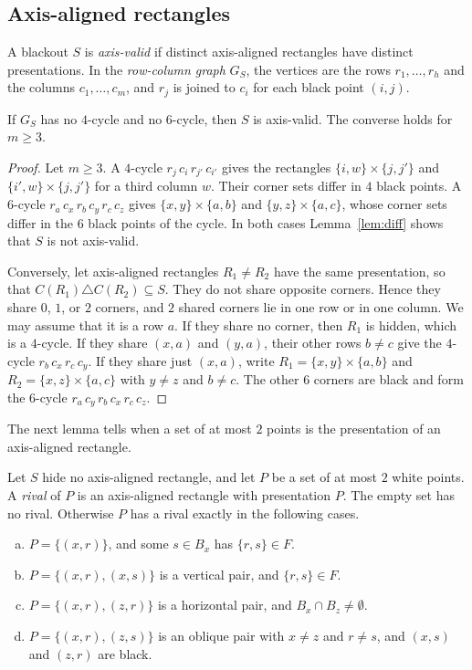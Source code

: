 \subsection{Axis-aligned rectangles}

A blackout $S$ is \emph{axis-valid} if distinct axis-aligned rectangles have
distinct presentations. In the \emph{row-column graph} $G_S$, the vertices are
the rows $r_1,\dots,r_h$ and the columns $c_1,\dots,c_m$, and $r_j$ is joined to
$c_i$ for each black point $(i,j)$.

\begin{lemma}\label{lem:girth}
If $G_S$ has no $4$-cycle and no $6$-cycle, then $S$ is axis-valid. The converse
holds for $m\ge3$.
\end{lemma}

\begin{proof}
Let $m\ge3$. A $4$-cycle $r_j\,c_i\,r_{j'}\,c_{i'}$ gives the rectangles
$\{i,w\}\times\{j,j'\}$ and $\{i',w\}\times\{j,j'\}$ for a third column $w$.
Their corner sets differ in $4$ black points. A $6$-cycle
$r_a\,c_x\,r_b\,c_y\,r_c\,c_z$ gives $\{x,y\}\times\{a,b\}$ and
$\{y,z\}\times\{a,c\}$, whose corner sets differ in the $6$ black points of the
cycle. In both cases Lemma~\ref{lem:diff} shows that $S$ is not axis-valid.

Conversely, let axis-aligned rectangles $R_1\ne R_2$ have the same presentation,
so that $C(R_1)\triangle C(R_2)\subseteq S$. They do not share opposite corners.
Hence they share $0$, $1$, or $2$ corners, and $2$ shared corners lie in one row
or in one column. We may assume that it is a row $a$. If they share no corner,
then $R_1$ is hidden, which is a $4$-cycle. If they share $(x,a)$ and $(y,a)$,
their other rows $b\ne c$ give the $4$-cycle $r_b\,c_x\,r_c\,c_y$. If they share
just $(x,a)$, write $R_1=\{x,y\}\times\{a,b\}$ and $R_2=\{x,z\}\times\{a,c\}$
with $y\ne z$ and $b\ne c$. The other $6$ corners are black and form the
$6$-cycle $r_a\,c_y\,r_b\,c_x\,r_c\,c_z$.
\end{proof}

The next lemma tells when a set of at most $2$ points is the presentation of
an axis-aligned rectangle.

\begin{lemma}\label{lem:rival}
Let $S$ hide no axis-aligned rectangle, and let $P$ be a set of at most $2$
white points. A \emph{rival} of $P$ is an axis-aligned rectangle with
presentation $P$. The empty set has no rival. Otherwise $P$ has a rival exactly
in the following cases.
\begin{enumerate}[(a)]
\item $P=\{(x,r)\}$, and some $s\in B_x$ has $\{r,s\}\in F$.
\item $P=\{(x,r),(x,s)\}$ is a vertical pair, and $\{r,s\}\in F$.
\item $P=\{(x,r),(z,r)\}$ is a horizontal pair, and $B_x\cap B_z\ne\emptyset$.
\item $P=\{(x,r),(z,s)\}$ is an oblique pair with $x\ne z$ and $r\ne s$, and
$(x,s)$ and $(z,r)$ are black.
\end{enumerate}
\end{lemma}

